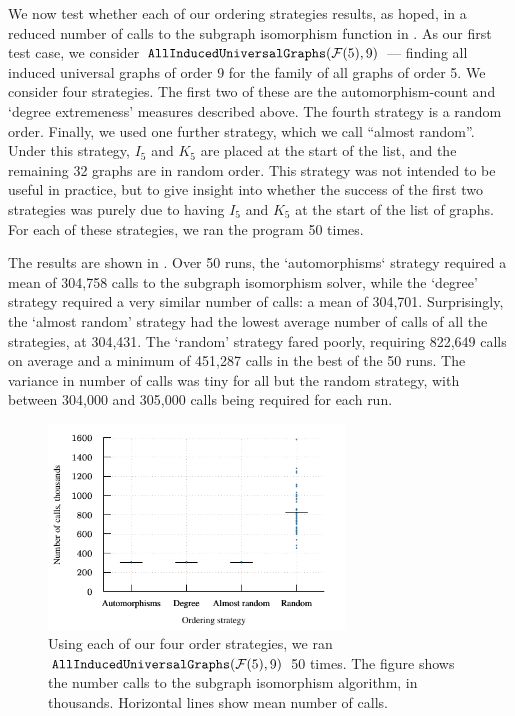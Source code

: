 \documentclass[12pt]{article}
\newcommand{\calF}{\ensuremath{\mathcal{F}}}
\begin{document}
We now test whether each of our ordering strategies results, as hoped,
in a reduced number of calls to the subgraph isomorphism function
in .  As our first test case, we consider 
$\FuncSty{AllInducedUniversalGraphs}(\calF(5),9)$ ---
finding all induced universal graphs of order 9 for the family of
all graphs of order 5.  We consider four strategies.
The first two of these are the automorphism-count and `degree extremeness'
measures described above.  The fourth strategy is a random order.
Finally, we used one further strategy, which we call ``almost random''.
Under this strategy, $I_5$ and $K_5$ are placed at the start of the list,
and the remaining 32 graphs are in random order.  This strategy was not
intended to be useful in practice, but to give insight into whether
the success of the first two strategies was purely due to having
$I_5$ and $K_5$ at the start of the list of graphs.
For each of these strategies, we ran the program 50 times.

The results are shown in .  Over 50 runs,
the `automorphisms` strategy required a mean of 304,758 calls to the subgraph
isomorphism solver, while the `degree' strategy required a very similar
number of calls:  a mean of 304,701.  Surprisingly, the `almost random'
strategy had the lowest average number of calls of all the strategies,
at 304,431.  The `random' strategy fared poorly, requiring 822,649
calls on average and a minimum of 451,287 calls in the best of the 50 runs.
The variance in number of calls was tiny for all but the random strategy,
with between 304,000 and 305,000 calls being required for each run.

\begin{figure}[htb]
    \centering

    \includegraphics*[width=0.7\textwidth]{img/second-experiment-plot}

    \caption{Using each of our four order strategies, we ran
        $\FuncSty{AllInducedUniversalGraphs}(\calF(5),9)$ 50 times. The figure
        shows the number calls to the subgraph isomorphism algorithm, in thousands.
        Horizontal lines show mean number of calls.}
\label{fig:second-experiment}
\end{figure}
\end{document}
